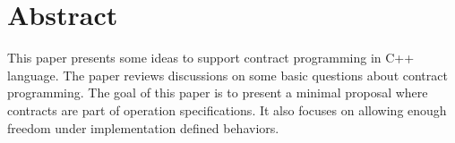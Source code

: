 \section*{Abstract}

This paper presents some ideas to support contract programming in C++ language.
The paper reviews discussions on some basic questions about contract programming.
The goal of this paper is to present a minimal proposal where contracts are
part of operation specifications. It also focuses on allowing enough freedom under
implementation defined behaviors.

